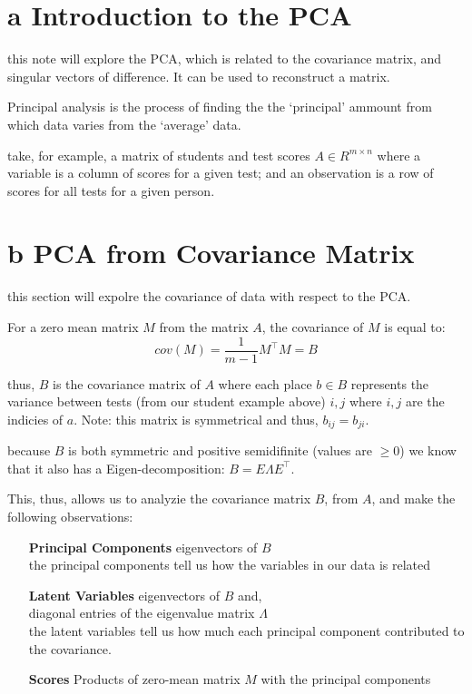 \documentclass[12pt]{book}
\title{\coursetitle\linebreak\lecturename}
\author{\\Cain Susko\\ 
           \\ \\ \\
      Queen's University 
    \\School of Computing\\}
\begin{document}
\begin{titlepage}
        \maketitle
\end{titlepage}


\section*{a Introduction to the PCA}
this note will explore the PCA, which is related to the covariance matrix, and singular vectors 
of difference. It can be used to reconstruct a matrix.

Principal analysis is the process of finding the the `principal' ammount from which data varies
from the `average' data.

take, for example, a matrix of students and test scores $A\in R^{m\times n}$ where a
variable is a column of scores for a given test; and an observation
is a row of scores for all tests for a given person.

\section*{b PCA from Covariance Matrix}
this section will expolre the covariance of data with respect to the PCA.

For a zero mean matrix $M$ from the matrix $A$, the covariance of $M$ is equal to:
\[cov(M) = \frac{1}{m-1}M^\top M = B\]

thus, $B$ is the covariance matrix of $A$ where each place $b\in B$ represents the variance
between tests (from our student example above) $i, j$ where $i,j$ are the indicies of $a$. 
Note: this matrix is symmetrical and thus, $b_{ij} = b_{ji}$. 

because $B$ is both symmetric and positive semidifinite (values are $\geq 0$) we know that
it also has a Eigen-decomposition: $B = E\Lambda E^\top$.

This, thus, allows us to analyzie the covariance matrix $B$, from $A$, and make the following 
observations:
\begin{itemize}
        \item[\textbf{Principal Components}] eigenvectors of $B$\\
                the principal components tell us how the variables in our data is related
        \item[\textbf{Latent Variables}] eigenvectors of $B$ and,\\
                diagonal entries of the eigenvalue matrix $\Lambda$\\
                the latent variables tell us how much each principal component contributed
                to the covariance.
        \item[\textbf{Scores}] Products of zero-mean matrix $M$ with the principal components
\end{itemize}
\end{document}
